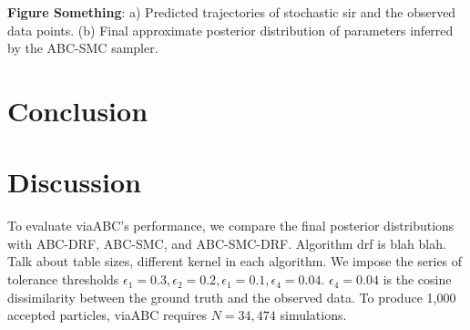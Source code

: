 \documentclass[12pt]{article} %
\begin{document}
\textbf{Figure Something}: a) Predicted trajectories of stochastic sir and the observed data points. (b) Final approximate posterior distribution of parameters inferred by the ABC-SMC sampler.




\section{Conclusion}
\section{Discussion}

To evaluate viaABC's performance, we compare the final posterior distributions with ABC-DRF, ABC-SMC, and ABC-SMC-DRF. Algorithm drf is blah blah. Talk about table sizes, different kernel in each algorithm. 
We impose the series of tolerance thresholds $\epsilon_1 = 0.3, \epsilon_2 = 0.2, \epsilon_1 = 0.1, \epsilon_4 = 0.04$. $\epsilon_4 = 0.04$ is the cosine dissimilarity between the ground truth and the observed data. To produce 1,000 accepted particles, viaABC requires $N = 34,474$ simulations.
\end{document}
